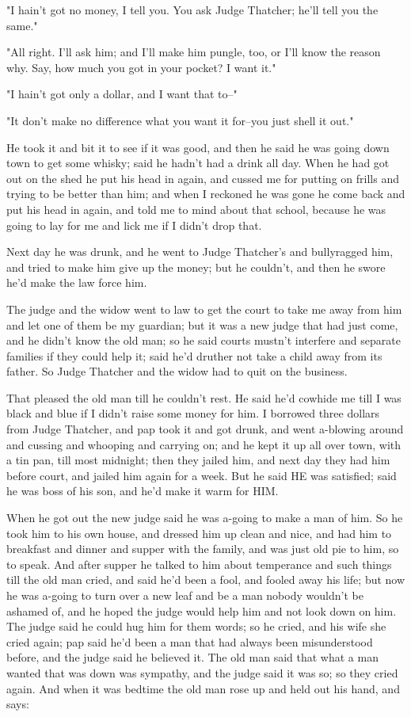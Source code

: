 "I hain't got no money, I tell you.  You ask Judge Thatcher; he'll tell
you the same."

"All right.  I'll ask him; and I'll make him pungle, too, or I'll know
the reason why.  Say, how much you got in your pocket?  I want it."

"I hain't got only a dollar, and I want that to--"

"It don't make no difference what you want it for--you just shell it
out."

He took it and bit it to see if it was good, and then he said he was
going down town to get some whisky; said he hadn't had a drink all day.
When he had got out on the shed he put his head in again, and cussed me
for putting on frills and trying to be better than him; and when I
reckoned he was gone he come back and put his head in again, and told me
to mind about that school, because he was going to lay for me and lick me
if I didn't drop that.

Next day he was drunk, and he went to Judge Thatcher's and bullyragged
him, and tried to make him give up the money; but he couldn't, and then
he swore he'd make the law force him.

The judge and the widow went to law to get the court to take me away from
him and let one of them be my guardian; but it was a new judge that had
just come, and he didn't know the old man; so he said courts mustn't
interfere and separate families if they could help it; said he'd druther
not take a child away from its father.  So Judge Thatcher and the widow
had to quit on the business.

That pleased the old man till he couldn't rest.  He said he'd cowhide me
till I was black and blue if I didn't raise some money for him.  I
borrowed three dollars from Judge Thatcher, and pap took it and got
drunk, and went a-blowing around and cussing and whooping and carrying
on; and he kept it up all over town, with a tin pan, till most midnight;
then they jailed him, and next day they had him before court, and jailed
him again for a week.  But he said HE was satisfied; said he was boss of
his son, and he'd make it warm for HIM.

When he got out the new judge said he was a-going to make a man of him.
So he took him to his own house, and dressed him up clean and nice, and
had him to breakfast and dinner and supper with the family, and was just
old pie to him, so to speak.  And after supper he talked to him about
temperance and such things till the old man cried, and said he'd been a
fool, and fooled away his life; but now he was a-going to turn over a new
leaf and be a man nobody wouldn't be ashamed of, and he hoped the judge
would help him and not look down on him.  The judge said he could hug him
for them words; so he cried, and his wife she cried again; pap said he'd
been a man that had always been misunderstood before, and the judge said
he believed it.  The old man said that what a man wanted that was down
was sympathy, and the judge said it was so; so they cried again.  And
when it was bedtime the old man rose up and held out his hand, and says:

